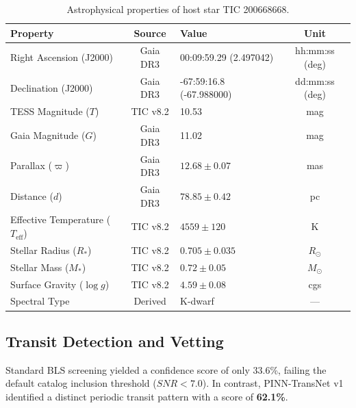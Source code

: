 \documentclass[11pt,a4paper]{article}
\begin{document}
\begin{table}[htbp]
\centering
\small
\caption{Astrophysical properties of host star TIC 200668668.}
\label{tab:host_params}
\begin{tabularx}{\textwidth}{l c X c}
\toprule
\textbf{Property} & \textbf{Source} & \textbf{Value} & \textbf{Unit} \\
\midrule
Right Ascension (J2000) & Gaia DR3 & 00:09:59.29 (2.497042) & hh:mm:ss (deg) \\
Declination (J2000)     & Gaia DR3 & -67:59:16.8 (-67.988000) & dd:mm:ss (deg) \\
TESS Magnitude ($T$)    & TIC v8.2 & 10.53 & mag \\
Gaia Magnitude ($G$)    & Gaia DR3 & 11.02 & mag \\
Parallax ($\varpi$)     & Gaia DR3 & $12.68 \pm 0.07$ & mas \\
Distance ($d$)          & Gaia DR3 & $78.85 \pm 0.42$ & pc \\
Effective Temperature ($T_{\text{eff}}$) & TIC v8.2 & $4559 \pm 120$ & K \\
Stellar Radius ($R_*$)  & TIC v8.2 & $0.705 \pm 0.035$ & $R_\odot$ \\
Stellar Mass ($M_*$)    & TIC v8.2 & $0.72 \pm 0.05$ & $M_\odot$ \\
Surface Gravity ($\log g$) & TIC v8.2 & $4.59 \pm 0.08$ & cgs \\
Spectral Type           & Derived  & K-dwarf & --- \\
\bottomrule
\end{tabularx}
\end{table}

\subsection{Transit Detection and Vetting}

Standard BLS screening yielded a confidence score of only 33.6\%, failing the default catalog inclusion threshold ($SNR < 7.0$). In contrast, PINN-TransNet v1 identified a distinct periodic transit pattern with a score of \textbf{62.1\%}.
\end{document}
